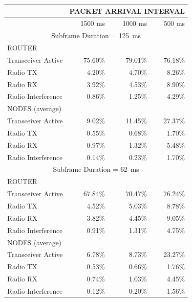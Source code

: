 \documentclass[conference]{IEEEtran}
\begin{document}
\begin{table}
\centering
\begin{tabular}{|l|r|r|r|}
\hline
 & \multicolumn{3}{|c|}{PACKET ARRIVAL INTERVAL}\\
\hline
 & 1500 ms & 1000 ms & 500 ms \\
\hline

\multicolumn{4}{|c|}{Subframe Duration = 125~ms}\\
\hline
 ROUTER & \multicolumn{3}{|c|}{ }\\
\hline
Transceiver Active & 75.60\% & 79.01\% & 76.18\% \\
Radio TX           &  4.20\% &  4.70\% &  8.26\% \\
Radio RX           &  3.92\% &  4.53\% &  8.90\% \\
Radio Interference &  0.86\% &  1.25\% &  4.29\% \\
\hline
 NODES (average) & \multicolumn{3}{|c|}{ }\\
\hline
Transceiver Active & 9.02\% & 11.45\% & 27.37\% \\
Radio TX           & 0.55\% &  0.68\% &  1.70\% \\
Radio RX           & 0.97\% &  1.32\% &  5.48\% \\
Radio Interference & 0.14\% &  0.23\% &  1.70\% \\
\hline

\multicolumn{4}{|c|}{Subframe Duration = 62~ms}\\
\hline
 ROUTER & \multicolumn{3}{|c|}{ }\\
\hline
Transceiver Active & 67.84\% & 70.47\% & 76.24\% \\
Radio TX           &  4.52\% &  5.03\% &  8.78\% \\
Radio RX           &  3.82\% &  4.45\% &  9.05\% \\
Radio Interference &  0.91\% &  1.31\% &  4.75\% \\
\hline
 NODES (average) & \multicolumn{3}{|c|}{ }\\
\hline
Transceiver Active & 6.78\% & 8.73\% & 23.27\% \\
Radio TX           & 0.53\% & 0.66\% &  1.76\% \\
Radio RX           & 0.74\% & 1.03\% &  4.45\% \\
Radio Interference & 0.12\% & 0.20\% &  1.56\% \\
\hline


\end{tabular}
\end{table}
\end{document}
